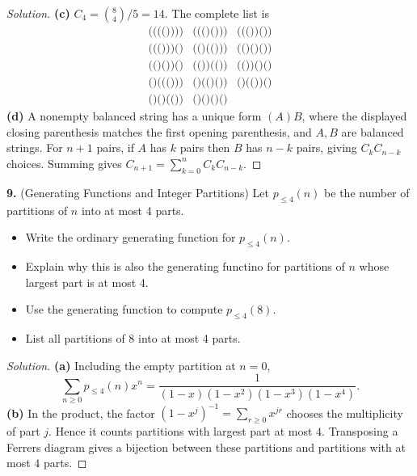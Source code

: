 \documentclass[12pt]{amsart}
\newenvironment{solution}
{\begin{proof}[Solution]}
{\end{proof}}
\begin{document}
\begin{onehalfspace}
\begin{solution}
            \textbf{(c)} $C_4=\binom84/5=14$. The complete list is
            \[
            \begin{array}{lll}
                \texttt{(((())))}&\texttt{((()()))}&\texttt{((())())}\\
                \texttt{((()))()}&\texttt{(()(()))}&\texttt{(()()())}\\
                \texttt{(()())()}&\texttt{(())(())}&\texttt{(())()()}\\
                \texttt{()((()))}&\texttt{()(()())}&\texttt{()(())()}\\
                \texttt{()()(())}&\texttt{()()()()}&
            \end{array}
            \]
            \textbf{(d)} A nonempty balanced string has a unique form
            $(A)B$, where the displayed closing parenthesis matches the
            first opening parenthesis, and $A,B$ are balanced strings.
            For $n+1$ pairs, if $A$ has $k$ pairs then $B$ has $n-k$ pairs,
            giving $C_kC_{n-k}$ choices. Summing gives
            $C_{n+1}=\sum_{k=0}^n C_kC_{n-k}$.
        \end{solution}

        \noindent\textbf{9.} (Generating Functions and Integer Partitions) Let $p_{\le 4}(n)$ be the
        number of partitions of $n$ into at most 4 parts.
        \begin{itemize}
            \item[(a)] Write the ordinary generating function for $p_{\le 4}(n)$.
            \item[(b)] Explain why this is also the generating functino for partitions of $n$ whose
            largest part is at most 4.
            \item[(c)] Use the generating function to compute $p_{\le 4}(8)$.
            \item[(d)] List all partitions of 8 into at most 4 parts.
        \end{itemize}

        \begin{solution}
            \textbf{(a)} Including the empty partition at $n=0$,
            \[
                \sum_{n\ge0}p_{\le4}(n)x^n
                =\frac{1}{(1-x)(1-x^2)(1-x^3)(1-x^4)}.
            \]
            \textbf{(b)} In the product, the factor
            $(1-x^j)^{-1}=\sum_{r\ge0}x^{jr}$ chooses the multiplicity
            of part $j$. Hence it counts partitions with largest part
            at most $4$. Transposing a Ferrers diagram gives a bijection
            between these partitions and partitions with at most $4$ parts.


\end{solution}
\end{onehalfspace}
\end{document}
